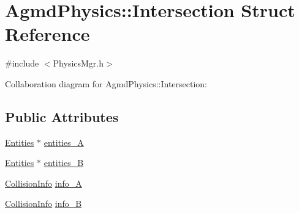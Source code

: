 \hypertarget{struct_agmd_physics_1_1_intersection}{\section{Agmd\+Physics\+:\+:Intersection Struct Reference}
\label{struct_agmd_physics_1_1_intersection}
}


{\ttfamily \#include $<$Physics\+Mgr.\+h$>$}



Collaboration diagram for Agmd\+Physics\+:\+:Intersection\+:
\subsection*{Public Attributes}
\begin{DoxyCompactItemize}
\item 
\hyperlink{class_agmd_physics_1_1_entities}{Entities} $\ast$ \hyperlink{struct_agmd_physics_1_1_intersection_a9cafc5c5df19e5fd0298cd729c572979}{entities\+\_\+\+A}
\item 
\hyperlink{class_agmd_physics_1_1_entities}{Entities} $\ast$ \hyperlink{struct_agmd_physics_1_1_intersection_a33fed9da6f6bc16c429b64633e653fb4}{entities\+\_\+\+B}
\item 
\hyperlink{struct_agmd_physics_1_1_collision_info}{Collision\+Info} \hyperlink{struct_agmd_physics_1_1_intersection_a4526df92d5b254303c370cae1d0d2231}{info\+\_\+\+A}
\item 
\hyperlink{struct_agmd_physics_1_1_collision_info}{Collision\+Info} \hyperlink{struct_agmd_physics_1_1_intersection_a24aca6ffedcb44b723b5ae33ec16cd44}{info\+\_\+\+B}
\end{DoxyCompactItemize}


